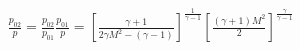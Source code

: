 \documentclass[10pt]{article}
\begin{document}
\begin{align*}\frac{p_{02}}{p}
=
\frac{p_{02}}{p_{01}} \frac{p_{01}}{p}
=
\left[
\frac{\gamma + 1}{2 \gamma M^{2} - \left( \gamma -1 \right) }
\right]^{\frac{1}{\gamma-1} }
\left[
\frac{\left( \gamma+1 \right) M^2 }{2}
\right]^{\frac{\gamma}{\gamma-1}}\end{align*}
\end{document}
